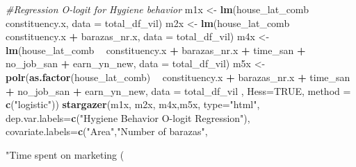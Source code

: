 \documentclass[
]{article}
\newenvironment{Shaded}{\begin{snugshade}}{\end{snugshade}}
\newcommand{\CommentTok}[1]{\textcolor[rgb]{0.56,0.35,0.01}{\textit{#1}}}
\newcommand{\DataTypeTok}[1]{\textcolor[rgb]{0.13,0.29,0.53}{#1}}
\newcommand{\KeywordTok}[1]{\textcolor[rgb]{0.13,0.29,0.53}{\textbf{#1}}}
\newcommand{\NormalTok}[1]{#1}
\newcommand{\OperatorTok}[1]{\textcolor[rgb]{0.81,0.36,0.00}{\textbf{#1}}}
\newcommand{\OtherTok}[1]{\textcolor[rgb]{0.56,0.35,0.01}{#1}}
\newcommand{\StringTok}[1]{\textcolor[rgb]{0.31,0.60,0.02}{#1}}
\begin{document}
\begin{Shaded}
\begin{Highlighting}[]
{{{{{{{{\CommentTok{#Regression O-logit for Hygiene behavior}
\NormalTok{m1x <-}\StringTok{ }\KeywordTok{lm}\NormalTok{(house_lat_comb }\OperatorTok{~}\StringTok{ }\NormalTok{constituency.x,}
         \DataTypeTok{data =}\NormalTok{ total_df_vil)}
\NormalTok{m2x <-}\StringTok{ }\KeywordTok{lm}\NormalTok{(house_lat_comb }\OperatorTok{~}\StringTok{ }\NormalTok{constituency.x }\OperatorTok{+}\StringTok{ }\NormalTok{barazas_nr.x,}
         \DataTypeTok{data =}\NormalTok{ total_df_vil)}
\NormalTok{m4x <-}\StringTok{ }\KeywordTok{lm}\NormalTok{(house_lat_comb }\OperatorTok{~}\StringTok{ }\NormalTok{constituency.x }\OperatorTok{+}\StringTok{ }\NormalTok{barazas_nr.x }\OperatorTok{+}\StringTok{ }\NormalTok{time_san }\OperatorTok{+}\StringTok{ }\NormalTok{no_job_san }\OperatorTok{+}\StringTok{ }\NormalTok{earn_yn_new,}
         \DataTypeTok{data =}\NormalTok{ total_df_vil)}
\NormalTok{m5x <-}\StringTok{ }\KeywordTok{polr}\NormalTok{(}\KeywordTok{as.factor}\NormalTok{(house_lat_comb) }\OperatorTok{~}\StringTok{  }\NormalTok{constituency.x }\OperatorTok{+}\StringTok{ }\NormalTok{barazas_nr.x }\OperatorTok{+}\StringTok{ }\NormalTok{time_san }\OperatorTok{+}\StringTok{ }\NormalTok{no_job_san }\OperatorTok{+}\StringTok{ }\NormalTok{earn_yn_new, }\DataTypeTok{data =}\NormalTok{ total_df_vil , }\DataTypeTok{Hess=}\OtherTok{TRUE}\NormalTok{, }\DataTypeTok{method =} \KeywordTok{c}\NormalTok{(}\StringTok{"logistic"}\NormalTok{))}
\KeywordTok{stargazer}\NormalTok{(m1x, m2x, m4x,m5x, }\DataTypeTok{type=}\StringTok{"html"}\NormalTok{,}
          \DataTypeTok{dep.var.labels=}\KeywordTok{c}\NormalTok{(}\StringTok{"Hygiene Behavior O-logit Regression"}\NormalTok{),}
          \DataTypeTok{covariate.labels=}\KeywordTok{c}\NormalTok{(}\StringTok{"Area"}\NormalTok{,}\StringTok{"Number of barazas"}\NormalTok{,}\StringTok{"Time spent on marketing (%) "}\NormalTok{,}
                             
}}}}}}}}}
\end{Highlighting}
\end{Shaded}
\end{document}
